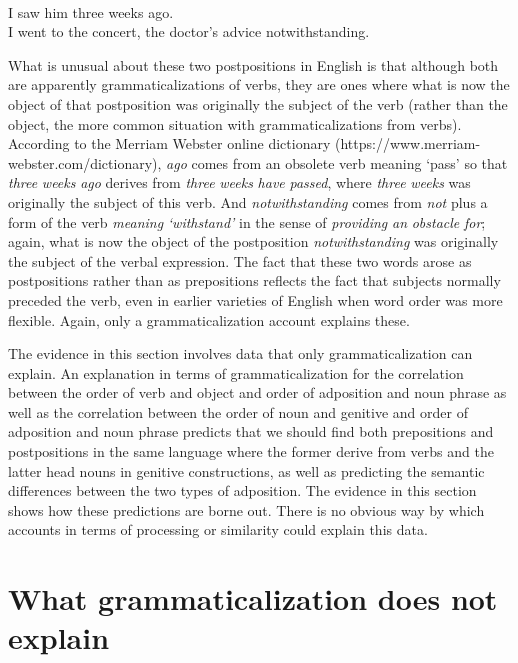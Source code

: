 \documentclass[output=paper]{langsci/langscibook}
\begin{document}
\ea\label{ex:dryer:}
\\
\ea  I saw him three weeks ago.\\
\ex  I went to the concert, the doctor’s advice notwithstanding.\\
\z
\z

What is unusual about these two postpositions in English is that although both are apparently grammaticalizations of verbs, they are ones where what is now the object of that postposition was originally the subject of the verb (rather than the object, the more common situation with grammaticalizations from verbs). According to the Merriam Webster online dictionary (https://www.merriam-webster.com/dictionary), \textit{ago} comes from an obsolete verb meaning ‘pass’ so that \textit{three} \textit{weeks} \textit{ago}  derives from \textit{three} \textit{weeks} \textit{have} \textit{passed}, where \textit{three} \textit{weeks} was originally the subject of this verb. And \textit{notwithstanding} comes from \textit{not} plus a form of the verb \textit{meaning} \textit{‘withstand’} in the sense of \textit{providing} \textit{an} \textit{obstacle} \textit{for}; again, what is now the object of the postposition \textit{notwithstanding} was originally the subject of the verbal expression. The fact that these two words arose as postpositions rather than as prepositions reflects the fact that subjects normally preceded the verb, even in earlier varieties of English when word order was more flexible. Again, only a grammaticalization account explains these.

The evidence in this section involves data that only grammaticalization can explain. An explanation in terms of grammaticalization for the correlation between the order of verb and object and order of adposition and noun phrase as well as the correlation between the order of noun and genitive and order of adposition and noun phrase predicts that we should find both prepositions and postpositions in the same language where the former derive from verbs and the latter head nouns in genitive constructions, as well as predicting the semantic differences between the two types of adposition. The evidence in this section shows how these predictions are borne out. There is no obvious way by which accounts in terms of processing or similarity could explain this data.

\section{What grammaticalization does not explain}
\end{document}
